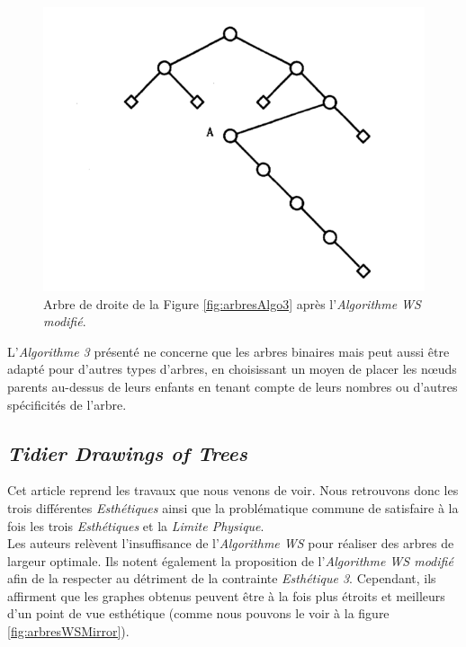 \documentclass{article}
\begin{document}
    \vfill
    \begin{figure}[h]
        \begin{center}
      		\includegraphics[scale=0.5]{arbreWS.png}
        \end{center}
    	\caption{Arbre de droite de la Figure \ref{fig:arbresAlgo3} après l'\emph{Algorithme WS modifié}. \cite{article79}}
      \label{fig:arbresAlgoWS}
    \end{figure}
    \vfill
    
    L'\emph{Algorithme 3} présenté ne concerne que les arbres binaires mais peut aussi être adapté pour d'autres types d'arbres, en choisissant un moyen de placer les n\oe{}uds parents au-dessus de leurs enfants en tenant compte de leurs nombres ou d'autres spécificités de l'arbre.\\

\newpage
  \subsection{\emph{Tidier Drawings of Trees}}

  Cet article \cite{article81} reprend les travaux que nous venons de voir. Nous retrouvons donc les trois différentes \emph{Esthétiques} ainsi que la problématique commune de satisfaire à la fois les trois \emph{Esthétiques} et la \emph{Limite Physique}.\\

  Les auteurs relèvent l'insuffisance de l'\emph{Algorithme WS} pour réaliser des arbres de largeur optimale. Ils notent également la proposition de l'\emph{Algorithme WS modifié} afin de la respecter au détriment de la contrainte \emph{Esthétique 3}. Cependant, ils affirment que les graphes obtenus peuvent être à la fois plus étroits et meilleurs d'un point de vue esthétique (comme nous pouvons le voir à la figure \ref{fig:arbresWSMirror}).\\
\end{document}
